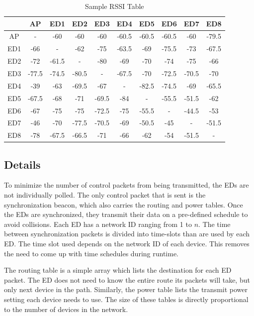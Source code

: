 \documentclass{article}
\begin{document}
\begin{table}[htb]
\begin{tabular}{|c|c|c|c|c|c|c|c|c|c|}
\hline  & AP & ED1 & ED2 & ED3 & ED4 & ED5 & ED6 & ED7 & ED8 \\ 
\hline AP & - & -60 & -60 & -60 & -60.5 & -60.5 & -60.5 & -60 & -79.5 \\ 
\hline ED1 & -66 & - & -62 & -75 & -63.5 & -69 & -75.5 & -73 & -67.5 \\ 
\hline ED2 & -72 & -61.5 & - & -80 & -69 & -70 & -74 & -75 & -66 \\ 
\hline ED3 & -77.5 & -74.5 & -80.5 & - & -67.5 & -70 & -72.5 & -70.5 & -70 \\ 
\hline ED4 & -39 & -63 & -69.5 & -67 & - & -82.5 & -74.5 & -69 & -65.5 \\ 
\hline ED5 & -67.5 & -68 & -71 & -69.5 & -84 & - & -55.5 & -51.5 & -62 \\ 
\hline ED6 & -67 & -75 & -75 & -72.5 & -75 & -55.5 & - & -44.5 & -53 \\ 
\hline ED7 & -46 & -70 & -77.5 & -70.5 & -69 & -50.5 & -45 & - & -51.5 \\ 
\hline ED8 & -78 & -67.5 & -66.5 & -71 & -66 & -62 & -54 & -51.5 & - \\ 
\hline 
\end{tabular} 
\caption{Sample RSSI Table}
\label{tab:rssi}
\end{table}


\subsection{Details}
To minimize the number of control packets from being transmitted, the EDs are not individually polled. The only control packet that is sent is the synchronization beacon, which also carries the routing and power tables. Once the EDs are synchronized, they transmit their data on a pre-defined schedule to avoid collisions. Each ED has a network ID ranging from 1 to $n$. The time between synchronization packets is divided into time-slots than are used by each ED. The time slot used depends on the network ID of each device. This removes the need to come up with time schedules during runtime.

The routing table is a simple array which lists the destination for each ED packet. The ED does not need to know the entire route its packets will take, but only next device in the path. Similarly, the power table lists the transmit power setting each device needs to use. The size of these tables is directly proportional to the number of devices in the network.
\end{document}
